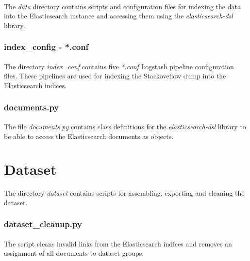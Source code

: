 \paragraph{}
The \textit{data} directory contains scripts and configuration files for indexing the data into the Elasticsearch instance and accessing them using the \textit{elasticsearch-dsl} library.

\subsubsection{index\_config - *.conf}
\paragraph{}
The directory \textit{index\_conf} contains five \textit{*.conf} Logstash pipeline configuration files. These pipelines are used for indexing the Stackoveflow dump into the Elasticsearch indices.  

\subsubsection{documents.py}
\paragraph{}
The file \textit{documents.py} contains class definitions for the \textit{elasticsearch-dsl} library to be able to access the Elasticsearch documents as objects.

\section{Dataset}
\paragraph{}
The directory \textit{dataset} contains scripts for assembling, exporting and cleaning the dataset.

\subsubsection{dataset\_cleanup.py}
\paragraph{}
The script cleans invalid links from the Elasticsearch indices and removes an assignment of all documents to dataset groups.

